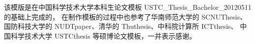 ﻿
\begin{thankspage}
该模版是在中国科学技术大学本科生论文模板 USTC\_Thesis\_Bachelor\_20120511 的基础上完成的，
在制作模板的过程中也参考了华南师范大学的 SCNUThesis、国防科技大学的 NUDTpaper、清华的 Thuthesis、中科院计算所 ICTthesis、
中国科学技术大学 USTCthesis 等硕博论文模板，一并表示感谢。
\end{thankspage}
